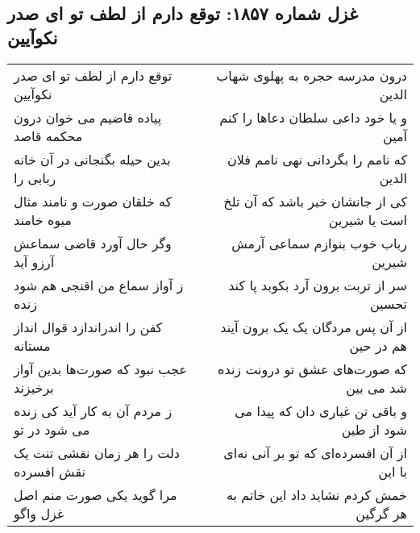 \begin{center}
\section*{غزل شماره ۱۸۵۷: توقع دارم از لطف تو ای صدر نکوآیین}
\label{sec:1857}
\begin{longtable}{l p{0.5cm} r}
توقع دارم از لطف تو ای صدر نکوآیین
&&
درون مدرسه حجره به پهلوی شهاب الدین
\\
پیاده قاضیم می خوان درون محکمه قاصد
&&
و یا خود داعی سلطان دعاها را کنم آمین
\\
بدین حیله بگنجانی در آن خانه ربابی را
&&
که نامم را بگردانی نهی نامم فلان الدین
\\
که خلقان صورت و نامند مثال میوه خامند
&&
کی از جانشان خبر باشد که آن تلخ است یا شیرین
\\
وگر حال آورد قاضی سماعش آرزو آید
&&
رباب خوب بنوازم سماعی آرمش شیرین
\\
ز آواز سماع من اقنجی هم شود زنده
&&
سر از تربت برون آرد بکوبد پا کند تحسین
\\
کفن را اندراندازد قوال انداز مستانه
&&
از آن پس مردگان یک یک برون آیند هم در حین
\\
عجب نبود که صورت‌ها بدین آواز برخیزند
&&
که صورت‌های عشق تو درونت زنده شد می بین
\\
ز مردم آن به کار آید کی زنده می شود در تو
&&
و باقی تن غباری دان که پیدا می شود از طین
\\
دلت را هر زمان نقشی تنت یک نقش افسرده
&&
از آن افسرده‌ای که تو بر آنی نه‌ای با این
\\
مرا گوید یکی صورت منم اصل غزل واگو
&&
خمش کردم نشاید داد این خاتم به هر گرگین
\\
\end{longtable}
\end{center}
